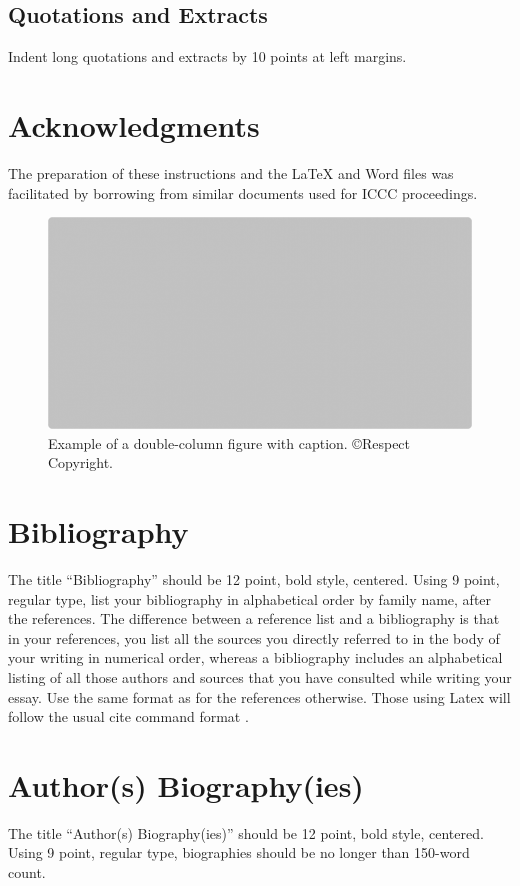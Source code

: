 \documentclass[letterpaper]{article}
\begin{document}
\subsection{Quotations and Extracts}
Indent long quotations and extracts by 10 points at left margins.

\section{Acknowledgments}
The preparation of these instructions and the \LaTeX{} and Word files was facilitated by borrowing from similar documents used for ICCC proceedings.

\begin{figure}
\includegraphics[width=\textwidth]{two-column-figure.png}
\caption{Example of a double-column figure with caption. \copyright Respect Copyright.}
\end{figure}

\section{Bibliography}
The title ``Bibliography'' should be 12 point, bold style, centered. Using 9 point, regular type, list your bibliography in alphabetical order by family name, after the references. The difference between a reference list and a bibliography is that in your references, you list all the sources you directly referred to in the body of your writing in numerical order, whereas a bibliography includes an alphabetical listing of all those authors and sources that you have consulted while writing your essay. Use the same format as for the references otherwise. Those using Latex will follow the usual cite command format \cite{boden92}.

\section{Author(s) Biography(ies)}
The title ``Author(s) Biography(ies)'' should be 12 point, bold style, centered. Using 9 point, regular type, biographies should be no longer than 150-word count.
\end{document}
